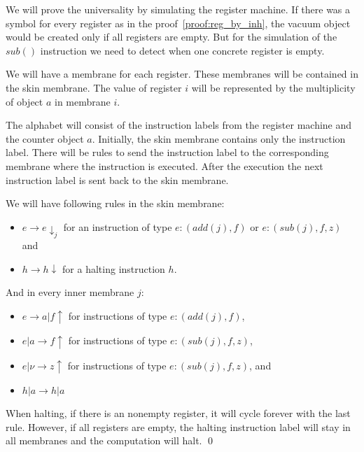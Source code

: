 \begin{dokaz}
  We will prove the universality by simulating the register machine. If there was a symbol for every register as in the proof~\ref{proof:reg_by_inh}, the vacuum object would be created only if all registers are empty. But for the simulation of the $sub()$ instruction we need to detect when one concrete register is empty.
  
  We will have a membrane for each register. These membranes will be contained in the skin membrane. The value of register $i$ will be represented by the multiplicity of object $a$ in membrane $i$.
  
  The alphabet will consist of the instruction labels from the register machine and the counter object $a$. Initially, the skin membrane contains only the instruction label. There will be rules to send the instruction label to the corresponding membrane where the instruction is executed. After the execution the next instruction label is sent back to the skin membrane.
  
  We will have following rules in the skin membrane:
  
  \begin{itemize}
  \item $e \rightarrow e\downarrow_j$ for an instruction of type $e : (add(j), f)$ or $e : (sub(j), f, z)$ and
  \item $h \rightarrow h\downarrow$ for a halting instruction $h$.
  \end{itemize}
  
  And in every inner membrane $j$:
  
  \begin{itemize}
  \item $e \rightarrow a|f\uparrow$ for instructions of type $e : (add(j), f)$,
  \item $e|a \rightarrow f\uparrow$ for instructions of type $e : (sub(j), f, z)$,
  \item $e|\nu \rightarrow z\uparrow$ for instructions of type $e : (sub(j), f, z)$, and
  \item $h|a \rightarrow h|a$
  \end{itemize}

  When halting, if there is an nonempty register, it will cycle forever with the last rule. However, if all registers are empty, the halting instruction label will stay in all membranes and the computation will halt. \qed  
\end{dokaz}
